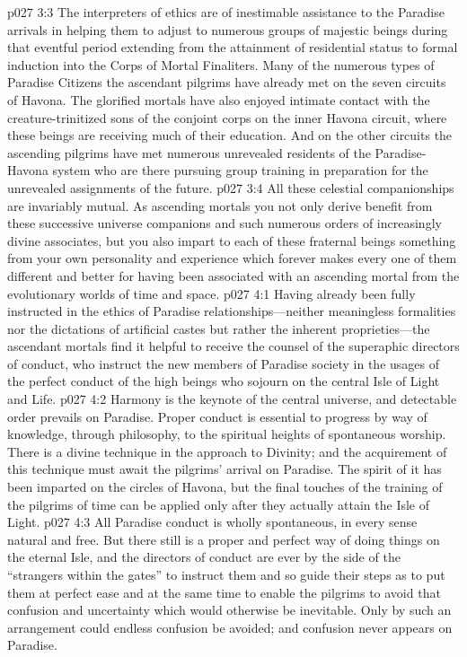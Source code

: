\vs p027 3:3 The interpreters of ethics are of inestimable assistance to the Paradise arrivals in helping them to adjust to numerous groups of majestic beings during that eventful period extending from the attainment of residential status to formal induction into the Corps of Mortal Finaliters. Many of the numerous types of Paradise Citizens the ascendant pilgrims have already met on the seven circuits of Havona. The glorified mortals have also enjoyed intimate contact with the creature\hyp{}trinitized sons of the conjoint corps on the inner Havona circuit, where these beings are receiving much of their education. And on the other circuits the ascending pilgrims have met numerous unrevealed residents of the Paradise\hyp{}Havona system who are there pursuing group training in preparation for the unrevealed assignments of the future.
\vs p027 3:4 All these celestial companionships are invariably mutual. As ascending mortals you not only derive benefit from these successive universe companions and such numerous orders of increasingly divine associates, but you also impart to each of these fraternal beings something from your own personality and experience which forever makes every one of them different and better for having been associated with an ascending mortal from the evolutionary worlds of time and space.\plusone
{}
\vs p027 4:1 Having already been fully instructed in the ethics of Paradise relationships---neither meaningless formalities nor the dictations of artificial castes but rather the inherent proprieties---the ascendant mortals find it helpful to receive the counsel of the superaphic directors of conduct, who instruct the new members of Paradise society in the usages of the perfect conduct of the high beings who sojourn on the central Isle of Light and Life.
\vs p027 4:2 Harmony is the keynote of the central universe, and detectable order prevails on Paradise. Proper conduct is essential to progress by way of knowledge, through philosophy, to the spiritual heights of spontaneous worship. There is a divine technique in the approach to Divinity; and the acquirement of this technique must await the pilgrims’ arrival on Paradise. The spirit of it has been imparted on the circles of Havona, but the final touches of the training of the pilgrims of time can be applied only after they actually attain the Isle of Light.
\vs p027 4:3 All Paradise conduct is wholly spontaneous, in every sense natural and free. But there still is a proper and perfect way of doing things on the eternal Isle, and the directors of conduct are ever by the side of the “strangers within the gates” to instruct them and so guide their steps as to put them at perfect ease and at the same time to enable the pilgrims to avoid that confusion and uncertainty which would otherwise be inevitable. Only by such an arrangement could endless confusion be avoided; and confusion never appears on Paradise.
